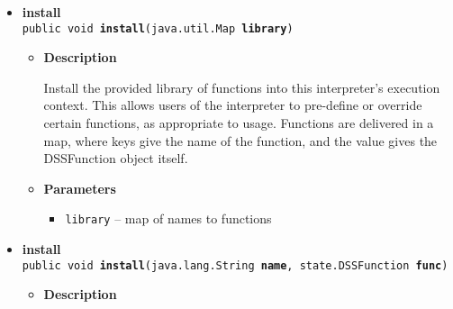 {{{{\begin{itemize}
{\begin{itemize}
{Install the provided library of functions into this interpreter's execution context. This allows users of the interpreter to pre-define or override certain functions, as appropriate to usage.
}
\item{
{\bf  Parameters}
  \begin{itemize}
   \item{
\texttt{library} -- }
  \end{itemize}
}%
\end{itemize}
}%
\item{ 
\hypertarget{org.openmrs.module.dssmodule.DSSInterpreter.install(java.util.Map)}{{\bf  install}\\}
\texttt{public void\ {\bf  install}(\texttt{java.util.Map} {\bf  library})
\label{org.openmrs.module.dssmodule.DSSInterpreter.install(java.util.Map)}}%
\begin{itemize}
\item{
{\bf  Description}

Install the provided library of functions into this interpreter's execution context. This allows users of the interpreter to pre-define or override certain functions, as appropriate to usage. Functions are delivered in a map, where keys give the name of the function, and the value gives the DSSFunction object itself.
}
\item{
{\bf  Parameters}
  \begin{itemize}
   \item{
\texttt{library} -- map of names to functions}
  \end{itemize}
}%
\end{itemize}
}%
\item{ 
\hypertarget{org.openmrs.module.dssmodule.DSSInterpreter.install(java.lang.String, org.openmrs.module.dssmodule.state.DSSFunction)}{{\bf  install}\\}
\texttt{public void\ {\bf  install}(\texttt{java.lang.String} {\bf  name},
\texttt{state.DSSFunction} {\bf  func})
\label{org.openmrs.module.dssmodule.DSSInterpreter.install(java.lang.String, org.openmrs.module.dssmodule.state.DSSFunction)}}%
\begin{itemize}
\item{
{\bf  Description}

}
\end{itemize}}
\end{itemize}}}}}
